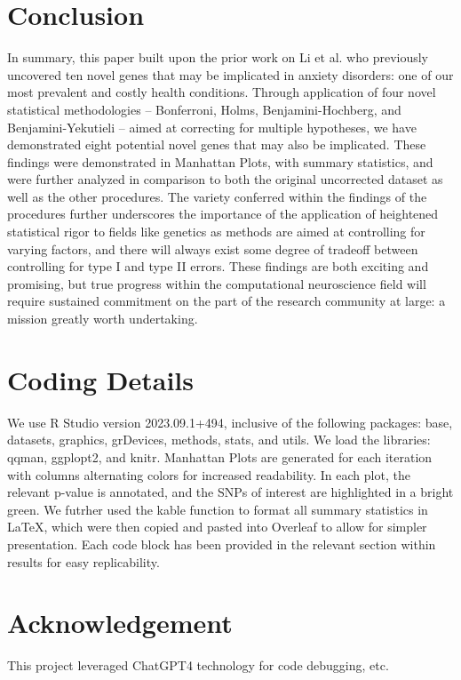 \documentclass[12pt]{article}
\begin{document}
\section{Conclusion}
In summary, this paper built upon the prior work on Li et al. who previously uncovered ten novel genes that may be implicated in anxiety disorders: one of our most prevalent and costly health conditions. Through application of four novel statistical methodologies -- Bonferroni, Holms, Benjamini-Hochberg, and Benjamini-Yekutieli -- aimed at correcting for multiple hypotheses, we have demonstrated eight potential novel genes that may also be implicated. These findings were demonstrated in Manhattan Plots, with summary statistics, and were further analyzed in comparison to both the original uncorrected dataset as well as the other procedures. The variety conferred within the findings of the procedures further underscores the importance of the application of heightened statistical rigor to fields like genetics as methods are aimed at controlling for varying factors, and there will always exist some degree of tradeoff between controlling for type I and type II errors. These findings are both exciting and promising, but true progress within the computational neuroscience field will require sustained commitment on the part of the research community at large: a mission greatly worth undertaking.

\newpage

\section{Coding Details}
We use R Studio version 2023.09.1+494, inclusive of the following packages: base, datasets, graphics, grDevices, methods, stats, and utils. We load the libraries: qqman, ggplopt2, and knitr. Manhattan Plots are generated for each iteration with columns alternating colors for increased readability. In each plot, the relevant p-value is annotated, and the SNPs of interest are highlighted in a bright green. We futrher used the kable function to format all summary statistics in LaTeX, which were then copied and pasted into Overleaf to allow for simpler presentation. Each code block has been provided in the relevant section within results for easy replicability.

\newpage

\section{Acknowledgement}
This project leveraged ChatGPT4 technology for code debugging, etc.
\end{document}
